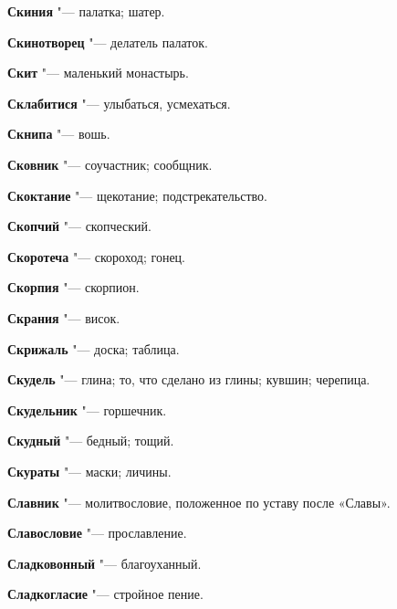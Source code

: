 \begin{mymulticols}{2}
\noindent\textbf{Скиния} "--- палатка; шатер. 




\noindent\textbf{Скинотворец} "--- делатель палаток. 




\noindent\textbf{Скит} "--- маленький монастырь. 




\noindent\textbf{Склабитися} "--- улыбаться, усмехаться. 




\noindent\textbf{Скнипа} "--- вошь. 




\noindent\textbf{Сковник} "--- соучастник; сообщник. 




\noindent\textbf{Скоктание} "--- щекотание; подстрекательство. 




\noindent\textbf{Скопчий} "--- скопческий. 




\noindent\textbf{Скоротеча} "--- скороход; гонец. 




\noindent\textbf{Скорпия} "--- скорпион. 




\noindent\textbf{Скрания} "--- висок. 




\noindent\textbf{Скрижаль} "--- доска; таблица. 




\noindent\textbf{Скудель} "--- глина; то, что сделано из глины; кувшин; черепица. 




\noindent\textbf{Скудельник} "--- горшечник. 




\noindent\textbf{Скудный} "--- бедный; тощий. 




\noindent\textbf{Скураты} "--- маски; личины. 




\noindent\textbf{Славник} "--- молитвословие, положенное по уставу после «Славы». 




\noindent\textbf{Славословие} "--- прославление. 




\noindent\textbf{Сладковонный} "--- благоуханный. 




\noindent\textbf{Сладкогласие} "--- стройное пение. 





\end{mymulticols}
